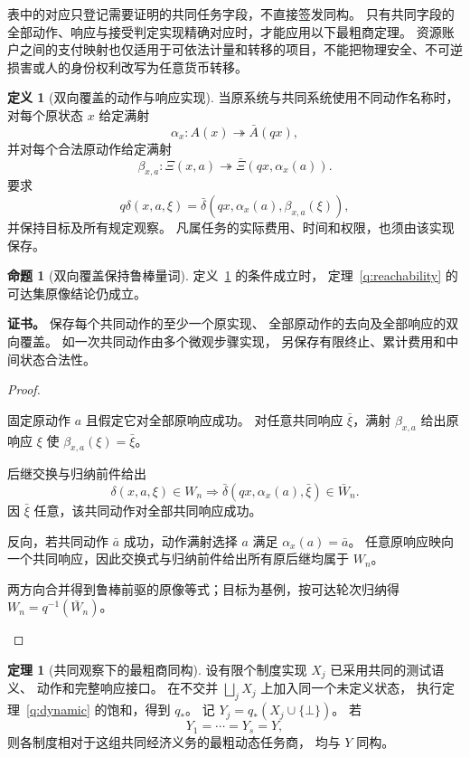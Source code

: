 \documentclass[UTF8,12pt,a4paper,openany,fontset=none,zihao=false]{ctexrep}
\theoremstyle{definition}
\newtheorem{definition}{定义}[chapter]
\newtheorem{theorem}{定理}[chapter]
\newtheorem{proposition}{命题}[chapter]
\newenvironment{certificate}{\par\noindent\textbf{证书。}\ignorespaces}{\par}
\newcommand{\1}{\mathbf 1}
\begin{document}
表中的对应只登记需要证明的共同任务字段，不直接签发同构。
只有共同字段的全部动作、响应与接受判定实现精确对应时，才能应用以下最粗商定理。
资源账户之间的支付映射也仅适用于可依法计量和转移的项目，不能把物理安全、不可逆损害或人的身份权利改写为任意货币转移。
\begin{definition}[双向覆盖的动作与响应实现]
\label{q:adapters}
当原系统与共同系统使用不同动作名称时，
对每个原状态 \(x\) 给定满射
\[
\alpha_x:A(x)\twoheadrightarrow\bar A(qx),
\]
并对每个合法原动作给定满射
\[
\beta_{x,a}:\Xi(x,a)
\twoheadrightarrow\bar\Xi(qx,\alpha_x(a)).
\]
要求
\[
q\delta(x,a,\xi)
=\bar\delta(qx,\alpha_x(a),\beta_{x,a}(\xi)),
\]
并保持目标及所有规定观察。
凡属任务的实际费用、时间和权限，也须由该实现保存。
\end{definition}
\begin{proposition}[双向覆盖保持鲁棒量词]
\label{q:adapter-reachability}
定义~\ref{q:adapters} 的条件成立时，
定理~\ref{q:reachability} 的可达集原像结论仍成立。
\end{proposition}
\begin{certificate}
保存每个共同动作的至少一个原实现、
全部原动作的去向及全部响应的双向覆盖。
如一次共同动作由多个微观步骤实现，
另保存有限终止、累计费用和中间状态合法性。
\end{certificate}
\begin{proof}
\begin{semanticsteps}
\item 固定原动作 \(a\) 且假定它对全部原响应成功。
对任意共同响应 \(\bar\xi\)，满射 \(\beta_{x,a}\) 给出原响应 \(\xi\) 使 \(\beta_{x,a}(\xi)=\bar\xi\)。
\item 后继交换与归纳前件给出
\[
\delta(x,a,\xi)\in W_n
\Longrightarrow
\bar\delta(qx,\alpha_x(a),\bar\xi)\in\bar W_n.
\]
因 \(\bar\xi\) 任意，该共同动作对全部共同响应成功。
\item 反向，若共同动作 \(\bar a\) 成功，动作满射选择 \(a\) 满足 \(\alpha_x(a)=\bar a\)。
任意原响应映向一个共同响应，因此交换式与归纳前件给出所有原后继均属于 \(W_n\)。
\item 两方向合并得到鲁棒前驱的原像等式；目标为基例，按可达轮次归纳得
\(W_n=q^{-1}(\bar W_n)\)。
\end{semanticsteps}
\end{proof}
\begin{theorem}[共同观察下的最粗商同构]
\label{q:common-image}
设有限个制度实现 \(X_j\) 已采用共同的测试语义、
动作和完整响应接口。
在不交并 \(\bigsqcup_jX_j\) 上加入同一个未定义状态，
执行定理~\ref{q:dynamic} 的饱和，得到 \(q_*\)。
记 \(Y_j=q_*(X_j\cup\{\bot\})\)。
若
\[
Y_1=\cdots=Y_s=Y,
\]
则各制度相对于这组共同经济义务的最粗动态任务商，
均与 \(Y\) 同构。
\end{theorem}
\end{document}
